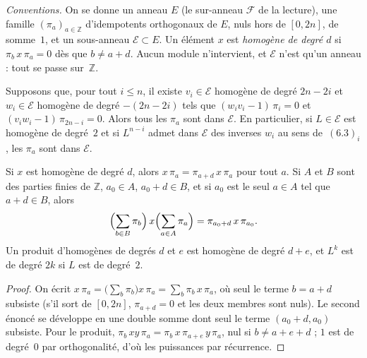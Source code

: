 \noindent\emph{Conventions.} On se donne un anneau $E$ (le sur-anneau $\mathcal F$ de la lecture), une famille $(\pi_a)_{a \in \mathbb Z}$ d'idempotents orthogonaux de $E$, nuls hors de $[0, 2n]$, de somme~$1$, et un sous-anneau $\mathcal E \subset E$. Un élément $x$ est \emph{homogène de degré $d$} si $\pi_b\, x\, \pi_a = 0$ dès que $b \neq a + d$. Aucun module n'intervient, et $\mathcal E$ n'est qu'un anneau : tout se passe sur~$\mathbb Z$.

\begin{enonce}
Supposons que, pour tout $i \leqslant n$, il existe $v_i \in \mathcal E$ homogène de degré $2n - 2i$ et $w_i \in \mathcal E$ homogène de degré $-(2n-2i)$ tels que $(w_i v_i - 1)\,\pi_i = 0$ et $(v_i w_i - 1)\,\pi_{2n-i} = 0$. Alors tous les $\pi_a$ sont dans $\mathcal E$. En particulier, si $L \in \mathcal E$ est homogène de degré~$2$ et si $L^{n-i}$ admet dans $\mathcal E$ des inverses $w_i$ au sens de~$(6.3)_i$, les $\pi_a$ sont dans $\mathcal E$.
\end{enonce}

\begin{lemme}\label{lem:16-homogene}
Si $x$ est homogène de degré $d$, alors $x\,\pi_a = \pi_{a+d}\, x\, \pi_a$ pour tout $a$. Si $A$ et $B$ sont des parties finies de $\mathbb Z$, $a_0 \in A$, $a_0 + d \in B$, et si $a_0$ est le seul $a \in A$ tel que $a + d \in B$, alors
\[
\Bigl(\sum_{b \in B} \pi_b\Bigr)\, x \Bigl(\sum_{a \in A} \pi_a\Bigr) = \pi_{a_0 + d}\, x\, \pi_{a_0}.
\]
Un produit d'homogènes de degrés $d$ et $e$ est homogène de degré $d + e$, et $L^k$ est de degré $2k$ si $L$ est de degré~$2$.
\end{lemme}

\begin{proof}
On écrit $x\,\pi_a = \bigl(\sum_b \pi_b\bigr) x\, \pi_a = \sum_b \pi_b\, x\, \pi_a$, où seul le terme $b = a + d$ subsiste (s'il sort de $[0, 2n]$, $\pi_{a+d} = 0$ et les deux membres sont nuls). Le second énoncé se développe en une double somme dont seul le terme $(a_0 + d, a_0)$ subsiste. Pour le produit, $\pi_b\, xy\, \pi_a = \pi_b\, x\, \pi_{a+e}\, y\, \pi_a$, nul si $b \neq a + e + d$ ; $1$ est de degré~$0$ par orthogonalité, d'où les puissances par récurrence.
\end{proof}

